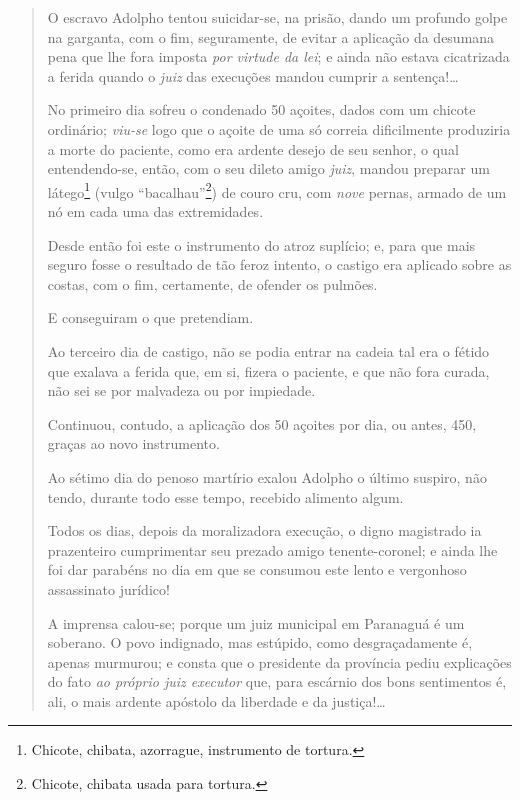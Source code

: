 \begin{quote}
O escravo Adolpho tentou suicidar-se, na prisão, dando um profundo
golpe na garganta, com o fim, seguramente, de evitar a aplicação da
desumana pena que lhe fora imposta \emph{por virtude da lei}; e ainda
não estava cicatrizada a ferida quando o \emph{juiz} das execuções
mandou cumprir a sentença!\ldots{}

No primeiro dia sofreu o condenado 50 açoites, dados com um chicote
ordinário; \emph{viu-se} logo que o açoite de uma só correia
dificilmente produziria a morte do paciente, como era ardente desejo de
seu senhor, o qual entendendo-se, então, com o seu dileto amigo
\emph{juiz}, mandou preparar um látego\footnote{Chicote, chibata,
  azorrague, instrumento de tortura.} (vulgo ``bacalhau''\footnote{
  Chicote, chibata usada para tortura.}) de couro cru, com \emph{nove}
pernas, armado de um nó em cada uma das extremidades.

Desde então foi este o instrumento do atroz suplício; e, para que mais
seguro fosse o resultado de tão feroz intento, o castigo era aplicado
sobre as costas, com o fim, certamente, de ofender os pulmões.

E conseguiram o que pretendiam.

Ao terceiro dia de castigo, não se podia entrar na cadeia tal era o
fétido que exalava a ferida que, em si, fizera o paciente, e que não
fora curada, não sei se por malvadeza ou por impiedade.

Continuou, contudo, a aplicação dos 50 açoites por dia, ou antes, 450,
graças ao novo instrumento.

Ao sétimo dia do penoso martírio exalou Adolpho o último suspiro, não
tendo, durante todo esse tempo, recebido alimento algum.

\noindent\dotfill

Todos os dias, depois da moralizadora execução, o digno magistrado ia
prazenteiro cumprimentar seu prezado amigo tenente-coronel; e ainda lhe
foi dar parabéns no dia em que se consumou este lento e vergonhoso
assassinato jurídico!

\noindent\dotfill

A imprensa calou-se; porque um juiz municipal em Paranaguá é um
soberano. O povo indignado, mas estúpido, como desgraçadamente é, apenas
murmurou; e consta que o presidente da província pediu explicações do
fato \emph{ao próprio juiz executor} que, para escárnio dos bons
sentimentos é, ali, o mais ardente apóstolo da liberdade e da
justiça!\ldots{}
\end{quote}

